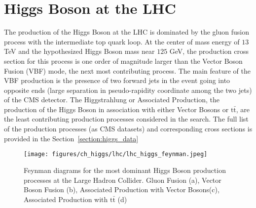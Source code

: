 \section{Higgs Boson at the LHC} \label{section:higgs_higgsatlhc}
The production of the Higgs Boson at the LHC is dominated by the gluon fusion process with the intermediate top quark loop. At the center of mass energy of $13$ TeV and the hypothesized Higgs Boson mass near $125$ GeV, the production cross section for this process is one order of magnitude larger than the Vector Boson Fusion (VBF) mode, the next most contributing process. The main feature of the VBF production is the presence of two forward jets in the event going into opposite ends (large separation in pseudo-rapidity coordinate among the two jets) of the CMS detector. The Higgstrahlung or Associated Production, the production of the Higgs Boson in association with either Vector Bosons or $\mathrm{t\bar{t}}$, are the least contributing production processes considered in the search. The full list of the production processes (as CMS datasets) and corresponding cross sections is provided in the Section~\ref{section:higgs_data}
\begin{figure}[hbp]
    \centering
    \texttt{[image: figures/ch\_higgs/lhc/lhc\_higgs\_feynman.jpeg]}
    \caption{Feynman diagrams for the most dominant Higgs Boson production processes at the Large Hadron Collider. Gluon Fusion (a), Vector Boson Fusion (b), Associated Production with Vector Bosons(c), Associated Production with $\mathrm{t\bar{t}}$ (d)}
\label{fig:higgs_cms_lhc}
\end{figure}


